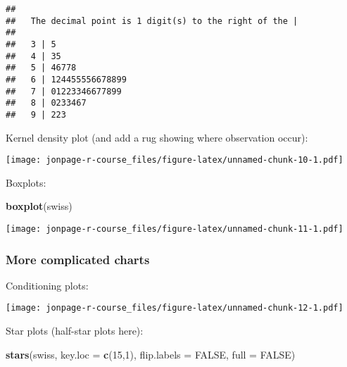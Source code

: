 \documentclass[]{book}
\newenvironment{Shaded}{\begin{snugshade}}{\end{snugshade}}
\newcommand{\KeywordTok}[1]{\textcolor[rgb]{0.13,0.29,0.53}{\textbf{{#1}}}}
\newcommand{\DataTypeTok}[1]{\textcolor[rgb]{0.13,0.29,0.53}{{#1}}}
\newcommand{\DecValTok}[1]{\textcolor[rgb]{0.00,0.00,0.81}{{#1}}}
\newcommand{\StringTok}[1]{\textcolor[rgb]{0.31,0.60,0.02}{{#1}}}
\newcommand{\OtherTok}[1]{\textcolor[rgb]{0.56,0.35,0.01}{{#1}}}
\newcommand{\NormalTok}[1]{{#1}}
\begin{document}
\begin{verbatim}
## 
##   The decimal point is 1 digit(s) to the right of the |
## 
##   3 | 5
##   4 | 35
##   5 | 46778
##   6 | 124455556678899
##   7 | 01223346677899
##   8 | 0233467
##   9 | 223
\end{verbatim}

Kernel density plot (and add a rug showing where observation occur):

\begin{Shaded}
\end{Shaded}

\texttt{[image: jonpage-r-course\_files/figure-latex/unnamed-chunk-10-1.pdf]}

Boxplots:

\begin{Shaded}
\begin{Highlighting}[]
\KeywordTok{boxplot}\NormalTok{(swiss)}
\end{Highlighting}
\end{Shaded}

\texttt{[image: jonpage-r-course\_files/figure-latex/unnamed-chunk-11-1.pdf]}

\subsubsection{More complicated charts}\label{more-complicated-charts}

Conditioning plots:

\begin{Shaded}
\end{Shaded}

\texttt{[image: jonpage-r-course\_files/figure-latex/unnamed-chunk-12-1.pdf]}

Star plots (half-star plots here):

\begin{Shaded}
\begin{Highlighting}[]
\KeywordTok{stars}\NormalTok{(swiss, }\DataTypeTok{key.loc =} \KeywordTok{c}\NormalTok{(}\DecValTok{15}\NormalTok{,}\DecValTok{1}\NormalTok{), }\DataTypeTok{flip.labels =} \OtherTok{FALSE}\NormalTok{, }\DataTypeTok{full =} \OtherTok{FALSE}\NormalTok{)}
\end{Highlighting}
\end{Shaded}
\end{document}
